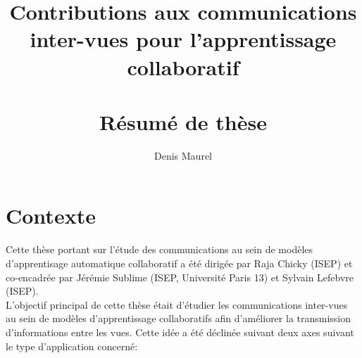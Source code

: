 \documentclass[a4paper]{article}
\begin{document}
\title{Contributions aux communications inter-vues pour l'apprentissage collaboratif\\~\\
\large Résumé de thèse}
\author{Denis Maurel}
\date{}

\maketitle

\section{Contexte}
Cette thèse portant sur l'\'{e}tude des communications au sein de mod\`{e}les d'apprentisage automatique collaboratif a \'{e}t\'{e} dirig\'{e}e par Raja Chicky (ISEP) et co-encadr\'{e}e par J\'{e}r\'{e}mie Sublime (ISEP, Universit\'{e} Paris 13) et Sylvain Lefebvre (ISEP).\\

L'objectif principal de cette th\`{e}se \'{e}tait d'\'{e}tudier les communications inter-vues au sein de mod\`{e}les d'apprentissage collaboratifs afin d'am\'{e}liorer la transmission d'informations entre les vues. Cette id\'{e}e a \'{e}t\'{e} d\'{e}clin\'{e}e suivant deux axes suivant le type d'application concern\'{e}:\\
\end{document}
